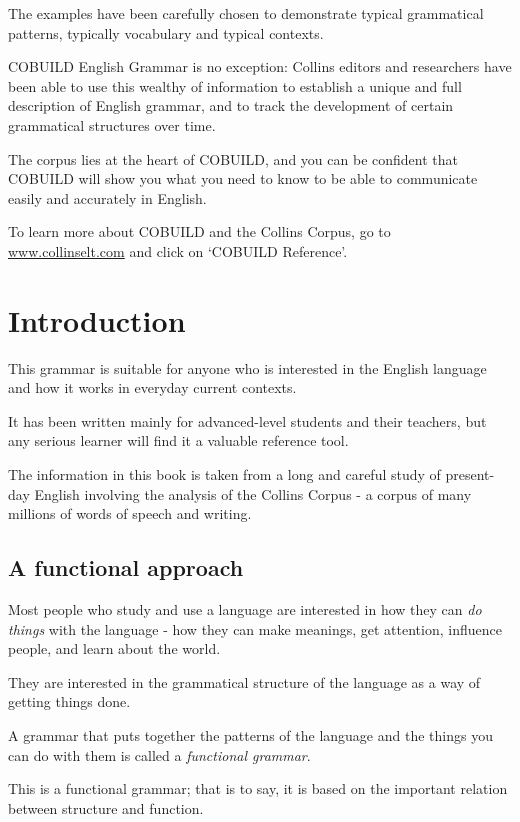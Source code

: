 \documentclass[oneside]{book}
\numberwithin{equation}{section}
\begin{document}
The examples have been carefully chosen to demonstrate typical grammatical patterns, typically vocabulary and typical contexts.

%
COBUILD English Grammar is no exception: Collins editors and researchers have been able to use this wealthy of information to establish a unique and full description of English grammar, and to track the development of certain grammatical structures over time.

%
The corpus lies at the heart of COBUILD, and you can be confident that COBUILD will show you what you need to know to be able to communicate easily and accurately in English.

%
To learn more about COBUILD and the Collins Corpus, go to \url{www.collinselt.com} and click on `COBUILD Reference'.


\section{Introduction}
This grammar is suitable for anyone who is interested in the English language and how it works in everyday current contexts.

It has been written mainly for advanced-level students and their teachers, but any serious learner will find it a valuable reference tool.

%
The information in this book is taken from a long and careful study of present-day English involving the analysis of the Collins Corpus - a corpus of many millions of words of speech and writing.

\subsection{A functional approach}
Most people who study and use a language are interested in how they can \textit{do things} with the language - how they can make meanings, get attention, influence people, and learn about the world.

They are interested in the grammatical structure of the language as a way of getting things done.

%
A grammar that puts together the patterns of the language and the things you can do with them is called a \textit{functional grammar}.

%
This is a functional grammar; that is to say, it is based on the important relation between structure and function.
\end{document}
